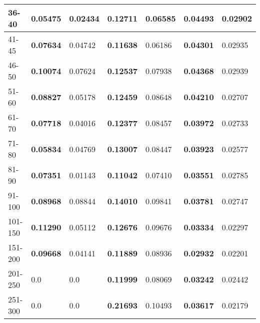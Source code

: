 \begin{table*}[h!]
\begin{tabular}{|l|l|l||l|l||l|l|}
        36-40     & \textbf{0.05475}                        & 0.02434                        & \textbf{0.12711}                 & 0.06585          & \textbf{0.04493} & 0.02902          \\ \hline
        41-45     & \textbf{0.07634}                        & 0.04742                        & \textbf{0.11638}                 & 0.06186          & \textbf{0.04301} & 0.02935          \\ \hline
        46-50     & \textbf{0.10074}                        & 0.07624                        & \textbf{0.12537}                 & 0.07938          & \textbf{0.04368} & 0.02939          \\ \hline
        51-60     & \textbf{0.08827}                        & 0.05178                        & \textbf{0.12459}                 & 0.08648          & \textbf{0.04210} & 0.02707          \\ \hline
        61-70     & \textbf{0.07718}                        & 0.04016                        & \textbf{0.12377}                 & 0.08457          & \textbf{0.03972} & 0.02733          \\ \hline
        71-80     & \textbf{0.05834}                        & 0.04769                        & \textbf{0.13007}                 & 0.08447          & \textbf{0.03923} & 0.02577          \\ \hline
        81-90     & \textbf{0.07351}                        & 0.01143                        & \textbf{0.11042}                 & 0.07410          & \textbf{0.03551} & 0.02785          \\ \hline
        91-100    & \textbf{0.08968}                        & 0.08844                        & \textbf{0.14010}                 & 0.09841          & \textbf{0.03781} & 0.02747          \\ \hline
        101-150   & \textbf{0.11290}                        & 0.05112                        & \textbf{0.12676}                 & 0.09676          & \textbf{0.03334} & 0.02297          \\ \hline
        151-200   & \textbf{0.09668}                        & 0.04141                        & \textbf{0.11889}                 & 0.08936          & \textbf{0.02932} & 0.02201          \\ \hline
        201-250   & 0.0                                     & 0.0                            & \textbf{0.11999}                 & 0.08069          & \textbf{0.03242} & 0.02442          \\ \hline
        251-300   & 0.0                                     & 0.0                            & \textbf{0.21693}                 & 0.10493          & \textbf{0.03617} & 0.02179          \\ \hline

\end{tabular}
\end{table*}
